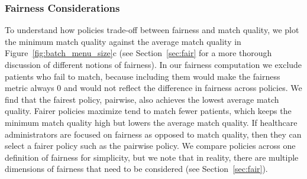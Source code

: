 \subsubsection{Fairness Considerations}
To understand how policies trade-off between fairness and match quality, we plot the minimum match quality against the average match quality in Figure~\ref{fig:batch_menu_size}c (see Section~\ref{sec:fair} for a more thorough discussion of different notions of fairness). 
In our fairness computation we exclude patients who fail to match, because including them would make the fairness metric always 0 and would not reflect the difference in fairness across policies.  
We find that the fairest policy, pairwise, also achieves the lowest average match quality. 
Fairer policies maximize tend to match fewer patients, which keeps the minimum match quality high but lowers the average match quality. 
If healthcare administrators are focused on fairness as opposed to match quality, then they can select a fairer policy such as the pairwise policy.
We compare policies across one definition of fairness for simplicity, but we note that in reality, there are multiple dimensions of fairness that need to be considered (see Section~\ref{sec:fair}). 